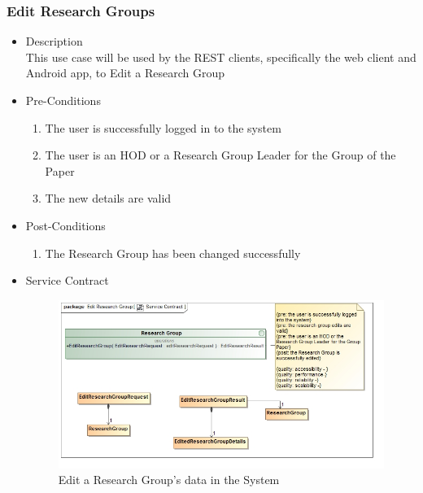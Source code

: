 \documentclass[a4paper,10pt]{article}
\begin{document}
\subsubsection{Edit Research Groups}
	\begin{itemize}
		\item Description\\
			This use case will be used by the REST clients, specifically the web client and Android app, to Edit a Research Group
		\item Pre-Conditions
			\begin{enumerate}
				\item The user is successfully logged in to the system
				\item The user is an HOD or a Research Group Leader for the Group of the Paper
				\item The new details are valid
			\end{enumerate}
		\item Post-Conditions
			\begin{enumerate}
				\item The Research Group has been changed successfully
						
			\end{enumerate}
		\item Service Contract
			\begin{figure}[H]
				\includegraphics[scale=0.5]{Edit_Research_Group.jpg}
				\caption{Edit a Research Group's data in the System}
			\end{figure}
	\end{itemize}
\end{document}
